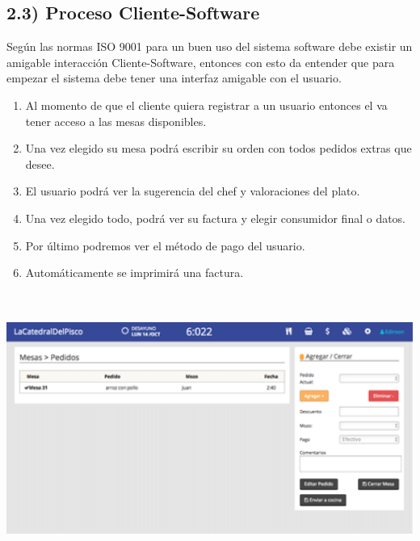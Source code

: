 \documentclass{article} %
\begin{document}
\noindent 

\noindent 

\noindent 

\noindent 


\subsection{2.3) Proceso Cliente-Software}

\noindent Seg\'{u}n las normas ISO 9001 para un buen uso del sistema software debe existir un amigable interacci\'{o}n Cliente-Software, entonces con esto da entender que para empezar el sistema debe tener una interfaz amigable con el usuario.

\begin{enumerate}
\item  Al momento de que el cliente quiera registrar a un usuario entonces el va tener acceso a las mesas disponibles.

\item  Una vez elegido su mesa podr\'{a} escribir su orden con todos pedidos extras que desee.

\item  El usuario podr\'{a} ver la sugerencia del chef y valoraciones del plato.

\item  Una vez elegido todo, podr\'{a} ver su factura y elegir consumidor final o datos.

\item  Por \'{u}ltimo podremos ver el m\'{e}todo de pago del usuario.

\item  Autom\'{a}ticamente se imprimir\'{a} una factura.
\end{enumerate}

\noindent \includegraphics*[width=6.75in, height=3.52in, keepaspectratio=false]{image6}
\end{document}
